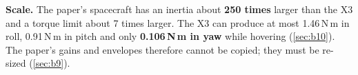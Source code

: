 \textbf{Scale.} The paper's spacecraft has an inertia about \textbf{250 times} larger than the X3 and a torque limit about 7
times larger. The X3 can produce at most 1.46\,N\,m in roll, 0.91\,N\,m in pitch and only \textbf{0.106\,N\,m in yaw} while
hovering (\cref{sec:b10}). The paper's gains and envelopes therefore cannot be copied; they must be re-sized
(\cref{sec:b9}).
